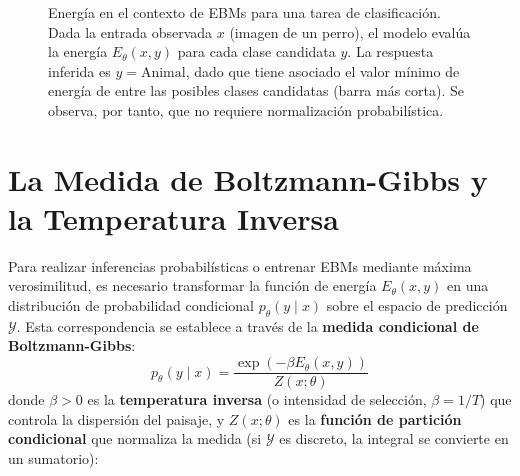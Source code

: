 \begin{figure}[H]
    \caption{Energía en el contexto de EBMs para una tarea de clasificación. Dada la entrada observada $x$ (imagen de un perro), el modelo evalúa la energía $E_\theta(x, y)$ para cada clase candidata $y$. La respuesta inferida es $y = \text{Animal}$, dado que tiene asociado el valor mínimo de energía de entre las posibles clases candidatas (barra más corta). Se observa, por tanto, que no requiere normalización probabilística.}
    \label{fig:ebm_inferencia_retriever}
\end{figure}

%
\section{La Medida de Boltzmann-Gibbs y la Temperatura Inversa}
\label{sec:boltzmann_gibbs}
Para realizar inferencias probabilísticas o entrenar EBMs mediante máxima verosimilitud, es necesario transformar la función de energía $E_\theta(x, y)$ en una distribución de probabilidad condicional $p_\theta(y \mid x)$ sobre el espacio de predicción $\mathcal{Y}$. Esta correspondencia se establece a través de la \textbf{medida condicional de Boltzmann-Gibbs}:
\begin{equation}
\label{eq:boltzmann_dist}
p_\theta(y \mid x) = \frac{\exp(-\beta E_\theta(x, y))}{Z(x; \theta)}
\end{equation}
donde $\beta > 0$ es la \textbf{temperatura inversa} (o intensidad de selección, $\beta = 1/T$) que controla la dispersión del paisaje, y $Z(x; \theta)$ es la \textbf{función de partición condicional} que normaliza la medida (si $\mathcal{Y}$ es discreto, la integral se convierte en un sumatorio):


